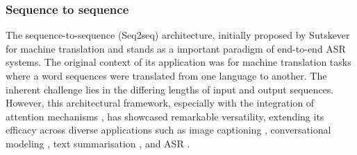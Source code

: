 



\subsubsection{Sequence to sequence}
The sequence-to-sequence (Seq2seq) architecture, initially proposed by Sutskever for machine translation \cite{sutskever2014sequence} and stands as a important paradigm of end-to-end ASR systems. The original context of its application was for machine translation tasks where a word sequences were translated from one language to another. The inherent challenge lies in the differing lengths of input and output sequences. However, this architectural framework, especially with the integration of attention mechanisms \cite{bahdanau2014neural}, has showcased remarkable versatility, extending its efficacy across diverse applications such as image captioning \cite{seq2seq_imagecaption}, conversational modeling \cite{vinyals2015neural}, text summarisation \cite{nallapati2016abstractive}, and ASR \cite{dong2018speech}.

